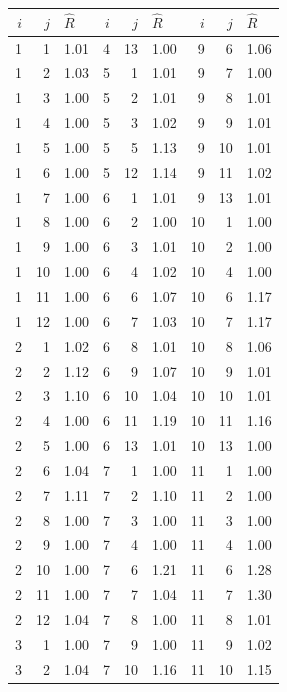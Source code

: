 \begin{table}
 \centering
 \begin{tabular}{|rrl||rrl||rrl|}
 \hline
 $i$ & $j$ & $\hat{R}$ & $i$ & $j$ & $\hat{R}$ & $i$ & $j$ & $\hat{R}$ \\
 \hline\hline
 1 & 1 & 1.01 & 4 & 13 & 1.00 & 9 & 6 & 1.06 \\
 1 & 2 & 1.03 & 5 & 1 & 1.01 & 9 & 7 & 1.00 \\
 1 & 3 & 1.00 & 5 & 2 & 1.01 & 9 & 8 & 1.01 \\
 1 & 4 & 1.00 & 5 & 3 & 1.02 & 9 & 9 & 1.01 \\
 1 & 5 & 1.00 & 5 & 5 & 1.13 & 9 & 10 & 1.01 \\
 1 & 6 & 1.00 & 5 & 12 & 1.14 & 9 & 11 & 1.02 \\
 1 & 7 & 1.00 & 6 & 1 & 1.01 & 9 & 13 & 1.01 \\
 1 & 8 & 1.00 & 6 & 2 & 1.00 & 10 & 1 & 1.00 \\
 1 & 9 & 1.00 & 6 & 3 & 1.01 & 10 & 2 & 1.00 \\
 1 & 10 & 1.00 & 6 & 4 & 1.02 & 10 & 4 & 1.00 \\
 1 & 11 & 1.00 & 6 & 6 & 1.07 & 10 & 6 & 1.17 \\
 1 & 12 & 1.00 & 6 & 7 & 1.03 & 10 & 7 & 1.17 \\
 2 & 1 & 1.02 & 6 & 8 & 1.01 & 10 & 8 & 1.06 \\
 2 & 2 & 1.12 & 6 & 9 & 1.07 & 10 & 9 & 1.01 \\
 2 & 3 & 1.10 & 6 & 10 & 1.04 & 10 & 10 & 1.01 \\
 2 & 4 & 1.00 & 6 & 11 & 1.19 & 10 & 11 & 1.16 \\
 2 & 5 & 1.00 & 6 & 13 & 1.01 & 10 & 13 & 1.00 \\
 2 & 6 & 1.04 & 7 & 1 & 1.00 & 11 & 1 & 1.00 \\
 2 & 7 & 1.11 & 7 & 2 & 1.10 & 11 & 2 & 1.00 \\
 2 & 8 & 1.00 & 7 & 3 & 1.00 & 11 & 3 & 1.00 \\
 2 & 9 & 1.00 & 7 & 4 & 1.00 & 11 & 4 & 1.00 \\
 2 & 10 & 1.00 & 7 & 6 & 1.21 & 11 & 6 & 1.28 \\
 2 & 11 & 1.00 & 7 & 7 & 1.04 & 11 & 7 & 1.30 \\
 2 & 12 & 1.04 & 7 & 8 & 1.00 & 11 & 8 & 1.01 \\
 3 & 1 & 1.00 & 7 & 9 & 1.00 & 11 & 9 & 1.02 \\
 3 & 2 & 1.04 & 7 & 10 & 1.16 & 11 & 10 & 1.15 \\

\end{tabular}
\end{table}
